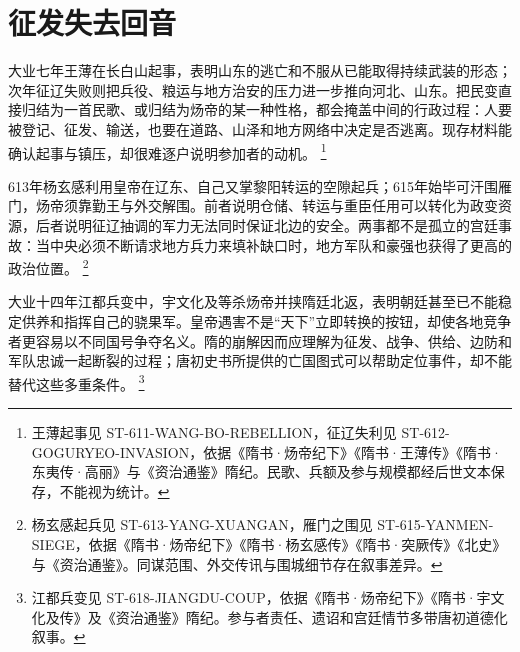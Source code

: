 \section{征发失去回音}
\label{sec:sui-collapse}

大业七年王薄在长白山起事，表明山东的逃亡和不服从已能取得持续武装的形态；次年征辽失败则把兵役、粮运与地方治安的压力进一步推向河北、山东。把民变直接归结为一首民歌、或归结为炀帝的某一种性格，都会掩盖中间的行政过程：人要被登记、征发、输送，也要在道路、山泽和地方网络中决定是否逃离。现存材料能确认起事与镇压，却很难逐户说明参加者的动机。%
\footnote{王薄起事见 ST-611-WANG-BO-REBELLION，征辽失利见 ST-612-GOGURYEO-INVASION，依据《隋书·炀帝纪下》《隋书·王薄传》《隋书·东夷传·高丽》与《资治通鉴》隋纪。民歌、兵额及参与规模都经后世文本保存，不能视为统计。}

613年杨玄感利用皇帝在辽东、自己又掌黎阳转运的空隙起兵；615年始毕可汗围雁门，炀帝须靠勤王与外交解围。前者说明仓储、转运与重臣任用可以转化为政变资源，后者说明征辽抽调的军力无法同时保证北边的安全。两事都不是孤立的宫廷事故：当中央必须不断请求地方兵力来填补缺口时，地方军队和豪强也获得了更高的政治位置。%
\footnote{杨玄感起兵见 ST-613-YANG-XUANGAN，雁门之围见 ST-615-YANMEN-SIEGE，依据《隋书·炀帝纪下》《隋书·杨玄感传》《隋书·突厥传》《北史》与《资治通鉴》。同谋范围、外交传讯与围城细节存在叙事差异。}

大业十四年江都兵变中，宇文化及等杀炀帝并挟隋廷北返，表明朝廷甚至已不能稳定供养和指挥自己的骁果军。皇帝遇害不是“天下”立即转换的按钮，却使各地竞争者更容易以不同国号争夺名义。隋的崩解因而应理解为征发、战争、供给、边防和军队忠诚一起断裂的过程；唐初史书所提供的亡国图式可以帮助定位事件，却不能替代这些多重条件。%
\footnote{江都兵变见 ST-618-JIANGDU-COUP，依据《隋书·炀帝纪下》《隋书·宇文化及传》及《资治通鉴》隋纪。参与者责任、遗诏和宫廷情节多带唐初道德化叙事。}
